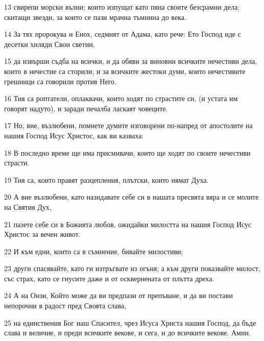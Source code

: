\par 13 свирепи морски вълни; които изпущат като пяна своите безсрамни дела; скитащи звезди, за които се пази мрачна тъмнина до века.
\par 14 За тях пророкува и Енох, седмият от Адама, като рече: Ето Господ иде с десетки хиляди Свои светии,
\par 15 да извърши съдба на всички, и да обяви за виновни всичките нечестиви дела, които в нечестие са сторили, и за всичките жестоки думи, които нечестивите грешници са говорили против Него.
\par 16 Тия са роптатели, оплаквачи, които ходят по страстите си, (и устата им говорят надуто), и заради печалба ласкаят човеците.
\par 17 Но, вие, възлюбени, помнете думите изговорени по-напред от апостолите на нашия Господ Исус Христос, как ви казваха:
\par 18 В последно време ще има присмивачи, които ще ходят по своите нечестиви страсти.
\par 19 Тия са, които правят разцепления, плътски, които нямат Духа.
\par 20 А вие възлюбени, като назидавате себе си в нашата пресвята вяра и се молите на Святия Дух,
\par 21 пазете себе си в Божията любов, ожидайки милостта на нашия Господ Исус Христос за вечен живот.
\par 22 И към едни, които са в съмнение, бивайте милостиви;
\par 23 други спасявайте, като ги изтръгвате из огъня; а към други показвайте милост, със страх, като се гнусите даже и от осквернената от плътта дреха.
\par 24 А на Онзи, Който може да ви предпази от препъване, и да ви постави непорочни в радост пред Своята слава,
\par 25 на единствения Бог наш Спасител, чрез Исуса Христа нашия Господ, да бъде слава и величие, и преди всичките векове, и сега, и до всичките векове. Амин.


